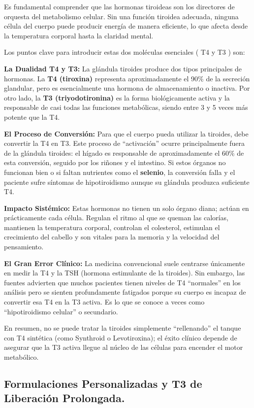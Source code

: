 \documentclass[
  spanish,
]{article}
\begin{document}
Es fundamental comprender que las hormonas tiroideas son los directores de orquesta del metabolismo celular. Sin una función tiroidea adecuada, ninguna célula del cuerpo puede producir energía de manera eficiente, lo que afecta desde la temperatura corporal hasta la claridad mental.

Los puntos clave para introducir estas dos moléculas esenciales ( T4 y T3 ) son:

\textbf{La Dualidad T4 y T3:} La glándula tiroides produce dos tipos principales de hormonas. La \textbf{T4 (tiroxina)} representa aproximadamente el 90\% de la secreción glandular, pero es esencialmente una hormona de almacenamiento o inactiva. Por otro lado, la \textbf{T3 (triyodotironina)} es la forma biológicamente activa y la responsable de casi todas las funciones metabólicas, siendo entre 3 y 5 veces más potente que la T4.

\textbf{El Proceso de Conversión:} Para que el cuerpo pueda utilizar la tiroides, debe convertir la T4 en T3. Este proceso de ``activación'' ocurre principalmente fuera de la glándula tiroides: el hígado es responsable de aproximadamente el 60\% de esta conversión, seguido por los riñones y el intestino. Si estos órganos no funcionan bien o si faltan nutrientes como el \textbf{selenio}, la conversión falla y el paciente sufre síntomas de hipotiroidismo aunque su glándula produzca suficiente T4.

\textbf{Impacto Sistémico:} Estas hormonas no tienen un solo órgano diana; actúan en prácticamente cada célula. Regulan el ritmo al que se queman las calorías, mantienen la temperatura corporal, controlan el colesterol, estimulan el crecimiento del cabello y son vitales para la memoria y la velocidad del pensamiento.

\textbf{El Gran Error Clínico:} La medicina convencional suele centrarse únicamente en medir la T4 y la TSH (hormona estimulante de la tiroides). Sin embargo, las fuentes advierten que muchos pacientes tienen niveles de T4 ``normales'' en los análisis pero se sienten profundamente fatigados porque su cuerpo es incapaz de convertir esa T4 en la T3 activa. Es lo que se conoce a veces como ``hipotiroidismo celular'' o secundario.

En resumen, no se puede tratar la tiroides simplemente ``rellenando'' el tanque con T4 sintética (como Synthroid o Levotiroxina); el éxito clínico depende de asegurar que la T3 activa llegue al núcleo de las células para encender el motor metabólico.

\subsection{Formulaciones Personalizadas y T3 de Liberación Prolongada.}\label{formulaciones-personalizadas-y-t3-de-liberaciuxf3n-prolongada.}
\end{document}
